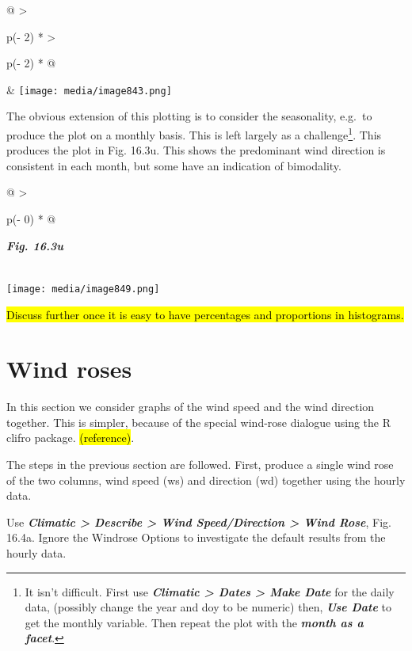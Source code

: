 \documentclass[
  letterpaper,
  DIV=11,
  numbers=noendperiod]{scrreprt}
\begin{document}
\begin{longtable}[]{@{}
  >{\raggedright\arraybackslash}p{(\columnwidth - 2\tabcolsep) * }
  >{\raggedright\arraybackslash}p{(\columnwidth - 2\tabcolsep) * }@{}}
\toprule\noalign{}
\endhead
\bottomrule\noalign{}
\endlastfoot
&
\texttt{[image: media/image843.png]} \\
\end{longtable}

The obvious extension of this plotting is to consider the seasonality,
e.g.~to produce the plot on a monthly basis. This is left largely as a
challenge\footnote{It isn't difficult. First use \textbf{\emph{Climatic
  \textgreater{} Dates \textgreater{} Make Date}} for the daily data,
  (possibly change the year and doy to be numeric) then,
  \textbf{\emph{Use Date}} to get the monthly variable. Then repeat the
  plot with the \textbf{\emph{month as a facet}}.}. This produces the
plot in Fig. 16.3u. This shows the predominant wind direction is
consistent in each month, but some have an indication of bimodality.

\begin{longtable}[]{@{}
  >{\raggedright\arraybackslash}p{(\columnwidth - 0\tabcolsep) * }@{}}
\toprule\noalign{}
\begin{minipage}[b]{\linewidth}\raggedright
\textbf{\emph{Fig. 16.3u}}
\end{minipage} \\
\midrule\noalign{}
\endhead
\bottomrule\noalign{}
\endlastfoot
\texttt{[image: media/image849.png]} \\
\end{longtable}

\hl{Discuss further once it is easy to have percentages and proportions
in histograms.}

\section{Wind roses}\label{wind-roses}

In this section we consider graphs of the wind speed and the wind
direction together. This is simpler, because of the special wind-rose
dialogue using the R clifro package. \hl{(reference)}.

The steps in the previous section are followed. First, produce a single
wind rose of the two columns, wind speed (ws) and direction (wd)
together using the hourly data.

Use \textbf{\emph{Climatic \textgreater{} Describe \textgreater{} Wind
Speed/Direction \textgreater{} Wind Rose}}, Fig. 16.4a. Ignore the
Windrose Options to investigate the default results from the hourly
data.
\end{document}
